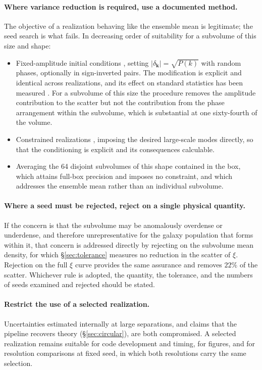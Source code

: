 \documentclass[12pt]{article}
\newcommand{\bk}{\mathbf{k}}
\begin{document}
\paragraph{Where variance reduction is required, use a documented method.}
The objective of a realization behaving like the ensemble mean is legitimate;
the seed search is what fails.  In decreasing order of suitability for a
subvolume of this size and shape:
\begin{itemize}
  \item Fixed-amplitude initial conditions \citep{Angulo2016}, setting
        $|\delta_{\bk}| = \sqrt{P(k)}$ with random phases, optionally in
        sign-inverted pairs.  The modification is explicit and identical across
        realizations, and its effect on standard statistics has been measured
        \citep{VillaescusaNavarro2018}.  For a subvolume of this size the
        procedure removes the amplitude contribution to the scatter but not the
        contribution from the phase arrangement within the subvolume, which is
        substantial at one sixty-fourth of the volume.
  \item Constrained realizations \citep{HoffmanRibak1991}, imposing the desired
        large-scale modes directly, so that the conditioning is explicit and
        its consequences calculable.
  \item Averaging the 64 disjoint subvolumes of this shape contained in the
        box, which attains full-box precision and imposes no constraint, and
        which addresses the ensemble mean rather than an individual subvolume.
\end{itemize}

\paragraph{Where a seed must be rejected, reject on a single physical
quantity.}  If the concern is that the subvolume may be anomalously overdense
or underdense, and therefore unrepresentative for the galaxy population that
forms within it, that concern is addressed directly by rejecting on the
subvolume mean density, for which \S\ref{sec:tolerance} measures no reduction
in the scatter of $\xi$.  Rejection on the full $\xi$ curve provides the same
assurance and removes $22\%$ of the scatter.  Whichever rule is adopted, the
quantity, the tolerance, and the numbers of seeds examined and rejected should
be stated.

\paragraph{Restrict the use of a selected realization.}  Uncertainties
estimated internally at large separations, and claims that the pipeline
recovers theory (\S\ref{sec:circular}), are both compromised.  A selected
realization remains suitable for code development and timing, for figures, and
for resolution comparisons at fixed seed, in which both resolutions carry the
same selection.
\end{document}
